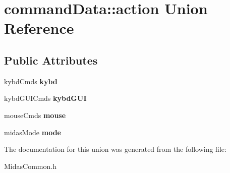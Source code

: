 \hypertarget{unioncommand_data_1_1action}{\section{command\+Data\+:\+:action Union Reference}
\label{unioncommand_data_1_1action}
}
\subsection*{Public Attributes}
\begin{DoxyCompactItemize}
\item 
\hypertarget{unioncommand_data_1_1action_ab4d14b74199bba55d007349404933734}{kybd\+Cmds {\bfseries kybd}}\label{unioncommand_data_1_1action_ab4d14b74199bba55d007349404933734}

\item 
\hypertarget{unioncommand_data_1_1action_aeaa40d20043aab277df48f0a67fbe3d7}{kybd\+G\+U\+I\+Cmds {\bfseries kybd\+G\+U\+I}}\label{unioncommand_data_1_1action_aeaa40d20043aab277df48f0a67fbe3d7}

\item 
\hypertarget{unioncommand_data_1_1action_a29fa372aa5f3d6adf40192e32b3de008}{mouse\+Cmds {\bfseries mouse}}\label{unioncommand_data_1_1action_a29fa372aa5f3d6adf40192e32b3de008}

\item 
\hypertarget{unioncommand_data_1_1action_a86fe172f27e1c549134a045ed3e6eb74}{midas\+Mode {\bfseries mode}}\label{unioncommand_data_1_1action_a86fe172f27e1c549134a045ed3e6eb74}

\end{DoxyCompactItemize}


The documentation for this union was generated from the following file\+:\begin{DoxyCompactItemize}
\item 
Midas\+Common.\+h\end{DoxyCompactItemize}
